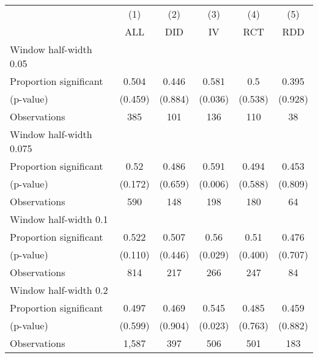 
\def\sym#1{\ifmmode^{#1}\else\(^{#1}\)\fi}
\begin{tabular}{l*{5}{c}}
\hline\hline
& \multicolumn{1}{c}{(1)} &  \multicolumn{1}{c}{(2)} &  \multicolumn{1}{c}{(3)} &  \multicolumn{1}{c}{(4)} &  \multicolumn{1}{c}{(5)}\\
& \multicolumn{1}{c}{ALL} &  \multicolumn{1}{c}{DID} &  \multicolumn{1}{c}{IV} &  \multicolumn{1}{c}{RCT} &  \multicolumn{1}{c}{RDD}\\

\hline
\hline
Window half-width 0.05\\

Proportion significant& 0.504 &  0.446 &  0.581 &  0.5 &  0.395\\

(p-value) & (0.459) &  (0.884) &  (0.036) &  (0.538) &  (0.928)\\

Observations& 385 &  101 &  136 &  110 &  38\\

\hline
Window half-width 0.075\\

Proportion significant& 0.52 &  0.486 &  0.591 &  0.494 &  0.453\\

(p-value) & (0.172) &  (0.659) &  (0.006) &  (0.588) &  (0.809)\\

Observations& 590 &  148 &  198 &  180 &  64\\

\hline
Window half-width 0.1\\

Proportion significant& 0.522 &  0.507 &  0.56 &  0.51 &  0.476\\

(p-value) & (0.110) &  (0.446) &  (0.029) &  (0.400) &  (0.707)\\

Observations& 814 &  217 &  266 &  247 &  84\\

\hline
Window half-width 0.2\\

Proportion significant& 0.497 &  0.469 &  0.545 &  0.485 &  0.459\\

(p-value) & (0.599) &  (0.904) &  (0.023) &  (0.763) &  (0.882)\\

Observations& 1,587 &  397 &  506 &  501 &  183\\


\end{tabular}
